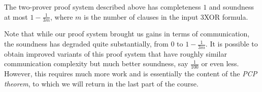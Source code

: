 \begin{claim}\label{claim:3xor-class}
The two-prover proof system described above has completeness $1$ and soundness at most $1-\frac{1}{3m}$, where $m$ is the number of clauses in the input $3$XOR formula. 
\end{claim}

Note that while our proof system brought us gains in terms of communication, the soundness has degraded quite substantially, from $0$ to $1-\frac{1}{3m}$. It is possible to obtain improved variants of this proof system that have roughly similar communication complexity but much better soundness, say $\frac{1}{100}$ or even less. However, this requires much more work and is essentially the content of the \emph{PCP theorem}, to which we will return in the last part of the course. 

